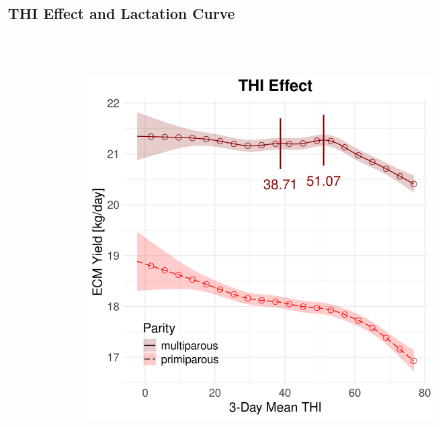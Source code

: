 \newpage
\paragraph{THI Effect and Lactation Curve} \quad \\
\begin{figure}[H]
    \centering
    \begin{subfigure}[b]{0.45\textwidth}
        \centering
        \includegraphics[width=\textwidth]{thesis/figures/models/ecm/after2010/ob_ecm_after2010/ob_ecm_after2010_marginal_thi_milk_combined.png}
    \end{subfigure}
    \hspace{0.05\textwidth} %
    \begin{subfigure}[b]{0.45\textwidth}
        \centering

\end{subfigure}
\end{figure}
